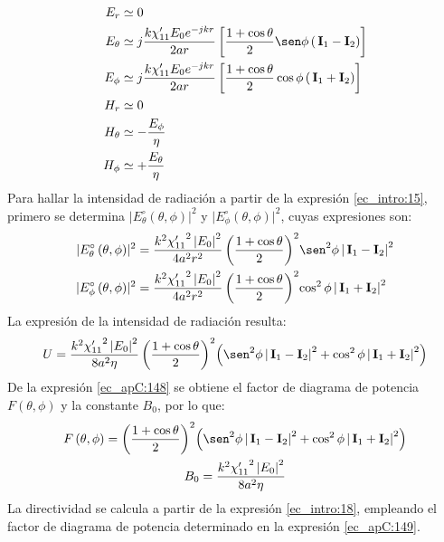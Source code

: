 \begin{subequations}
\label{grup_ec_apC:30}
\begin{align}
E_r &\simeq 0
\label{ec_apC:140}\\
E_{\theta} &\simeq j\dfrac{k\chi '_{11}E_0e^{-jkr}}{2ar}\left[\dfrac{1 + \cos\theta}{2}\sen\phi\left(\,\mathbf{I}_1 - \mathbf{I}_2\right)\right]
\label{ec_apC:141}\\
E_{\phi} &\simeq j\dfrac{k\chi '_{11}E_0e^{-jkr}}{2ar}\left[\dfrac{1 + \cos\theta}{2}\cos\phi\left(\,\mathbf{I}_1 + \mathbf{I}_2\right)\right]
\label{ec_apC:142}\\
H_r &\simeq 0
\label{ec_apC:143}\\
H_\theta &\simeq -\frac{E_\phi}{\eta}
\label{ec_apC:144}\\
H_\phi &\simeq +\frac{E_\theta}{\eta}
\label{ec_apC:145}
\end{align}
\end{subequations}
Para hallar la intensidad de radiación a partir de la expresión \eqref{ec_intro:15}, primero se determina $\lvert E_{\theta}^{\circ}\left(\theta,\phi\right)\rvert^2$ y $\lvert E_{\phi}^{\circ}\left(\theta,\phi\right)\vert^2$, cuyas expresiones son:
\begin{subequations}
\label{grup_ec_apC:31}
\begin{align}
\lvert E_{\theta}^{\circ}\left(\theta,\phi\right)\rvert^2 &= \frac{k^2{\chi '_{11}}^2\left|E_0\right|^2}{4a^2r^2}\left(\dfrac{1 + \cos\theta}{2}\right)^2\!\sen^2\phi\left|\,\mathbf{I}_1 - \mathbf{I}_2\right|^2
\label{ec_apC:146}\\
\lvert E_{\phi}^{\circ}\left(\theta,\phi\right)\rvert^2 &= \frac{k^2{\chi '_{11}}^2\left|E_0\right|^2}{4a^2r^2}\left(\dfrac{1 + \cos\theta}{2}\right)^2\!\cos^2\phi\left|\,\mathbf{I}_1 + \mathbf{I}_2\right|^2
\label{ec_apC:147}
\end{align}
\end{subequations}
La expresión de la intensidad de radiación resulta:
\begin{align}
U = \frac{k^2{\chi '_{11}}^2\left|E_0\right|^2}{8a^2\eta}\left(\dfrac{1 + \cos\theta}{2}\right)^2\!\left(\sen^2\phi\left|\,\mathbf{I}_1 - \mathbf{I}_2\right|^2 + \cos^2\phi\left|\,\mathbf{I}_1 + \mathbf{I}_2\right|^2\right)
\label{ec_apC:148}
\end{align}
De la expresión \eqref{ec_apC:148} se obtiene el factor de diagrama de potencia $F\left(\theta,\phi\right)$ y la constante $B_0$, por lo que:
\begin{gather}
F\left(\theta,\phi\right) = \left(\dfrac{1 + \cos\theta}{2}\right)^2\!\left(\sen^2\phi\left|\,\mathbf{I}_1 - \mathbf{I}_2\right|^2 + \cos^2\phi\left|\,\mathbf{I}_1 + \mathbf{I}_2\right|^2\right)
\label{ec_apC:149}\\
B_0 = \frac{k^2{\chi '_{11}}^2\left|E_0\right|^2}{8a^2\eta}
\label{ec_apC:150}
\end{gather}
La directividad se calcula a partir de la expresión \eqref{ec_intro:18}, empleando el factor de diagrama de potencia determinado en la expresión \eqref{ec_apC:149}.
